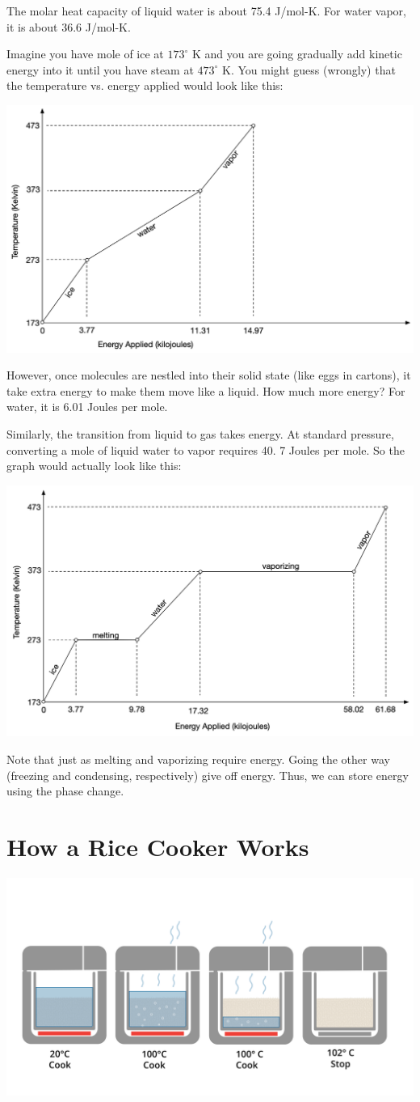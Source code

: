 The molar heat capacity of liquid water is about 75.4 J/mol-K.  For water vapor, it is about 36.6 J/mol-K.

Imagine you have mole of ice at $173^\circ$ K  and you are going gradually add kinetic energy into it until you have steam at $473^\circ$ K.  You might guess (wrongly) that the temperature vs. energy applied would look like this:

\includegraphics[width=0.8\linewidth]{energynaive.png}

However,  once molecules are nestled into their solid state (like eggs in cartons),  it take extra energy to make them move like a liquid.  How much more energy?  For water,  it is 6.01 Joules per mole.

Similarly,  the transition from liquid to gas takes energy.  At standard pressure,  converting a mole of liquid water to vapor requires 40. 7 Joules per mole.  So the graph would actually look like this:

\includegraphics[width=0.8\linewidth]{energysoph.png}

Note that just as melting and vaporizing require energy.   Going the other way (freezing and condensing, respectively) give off energy.    Thus, we can store energy using the phase change.

\section{How a Rice Cooker Works}

\includegraphics[width=0.9\linewidth]{riceCookerPhase.png}




